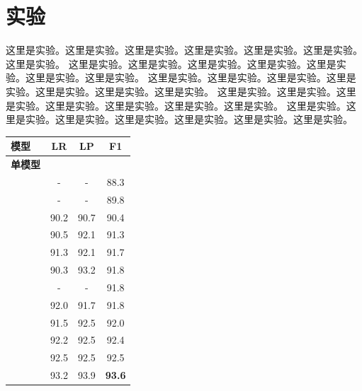 \documentclass[11pt,a4paper]{article}
\begin{document}
\section{实验}
这里是实验。这里是实验。这里是实验。这里是实验。这里是实验。这里是实验。这里是实验。
这里是实验。这里是实验。这里是实验。这里是实验。这里是实验。这里是实验。这里是实验。
这里是实验。这里是实验。这里是实验。这里是实验。这里是实验。这里是实验。这里是实验。
这里是实验。这里是实验。这里是实验。这里是实验。这里是实验。这里是实验。这里是实验。
这里是实验。这里是实验。这里是实验。这里是实验。这里是实验。这里是实验。这里是实验。
\begin{table}[htbp]
    \normalsize
    \begin{center}
        \begin{tabular}{l|ccc}
            \hline
            模型                                     & LR   & LP   & F1            \\
            \hline
            \textbf{单模型}                                                         \\
            \hline
            \citet{DBLP:conf/nips/VinyalsKKPSH15}     & -    & -    & 88.3          \\
            \citet{DBLP:conf/naacl/DyerKBS16}         & -    & -    & 89.8          \\
            \citet{DBLP:conf/acl/ZhuZCZZ13}           & 90.2 & 90.7 & 90.4          \\
            \citet{DBLP:conf/emnlp/CrossH16}          & 90.5 & 92.1 & 91.3          \\
            \citet{DBLP:journals/tacl/LiuZ17}         & 91.3 & 92.1 & 91.7          \\
            \citet{DBLP:conf/acl/SternAK17}           & 90.3 & 93.2 & 91.8          \\
            \citet{DBLP:journals/tacl/LiuZ17a}        & -    & -    & 91.8          \\
            \citet{DBLP:conf/acl/BengioSCJLS18}       & 92.0 & 91.7 & 91.8          \\
            \citet{DBLP:conf/acl/HongH18}             & 91.5 & 92.5 & 92.0          \\
            \citet{DBLP:conf/coling/TengZ18}          & 92.2 & 92.5 & 92.4          \\
            \citet{DBLP:conf/emnlp/SternFK17}         & 92.5 & 92.5 & 92.5          \\
            \citet{DBLP:conf/acl/KleinK18}            & 93.2 & 93.9 & \textbf{93.6} \\

\end{tabular}
\end{center}
\end{table}
\end{document}

